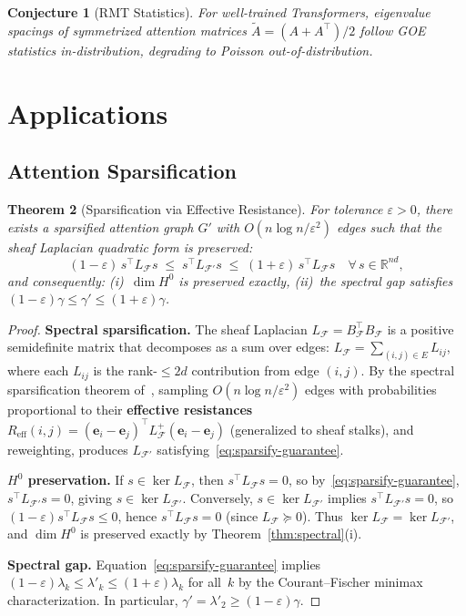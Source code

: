 \documentclass[11pt,a4paper]{article}
\theoremstyle{plain}
\newtheorem{theorem}{Theorem}[section]
\newtheorem{conjecture}[theorem]{Conjecture}
\theoremstyle{definition}
\theoremstyle{remark}
\newcommand{\R}{\mathbb{R}}
\newcommand{\cF}{\mathcal{F}}
\begin{document}
\begin{conjecture}[RMT Statistics]\label{conj:rmt}
For well-trained Transformers, eigenvalue spacings of symmetrized attention matrices $\tilde{A} = (A + A^\top)/2$ follow GOE statistics in-distribution, degrading to Poisson out-of-distribution.
\end{conjecture}

\section{Applications}\label{sec:applications}

\subsection{Attention Sparsification}

\begin{theorem}[Sparsification via Effective Resistance]\label{thm:sparse}
For tolerance $\varepsilon > 0$, there exists a sparsified attention graph $G'$ with $O(n \log n / \varepsilon^2)$ edges such that the sheaf Laplacian quadratic form is preserved:
\begin{equation}\label{eq:sparsify-guarantee}
(1 - \varepsilon)\, s^\top L_\cF s \;\leq\; s^\top L_{\cF'} s \;\leq\; (1 + \varepsilon)\, s^\top L_\cF s \quad \forall\, s \in \R^{nd},
\end{equation}
and consequently: (i)~$\dim H^0$ is preserved exactly, (ii)~the spectral gap satisfies $(1-\varepsilon)\gamma \leq \gamma' \leq (1+\varepsilon)\gamma$.
\end{theorem}

\begin{proof}
\textbf{Spectral sparsification.} The sheaf Laplacian $L_\cF = B_\cF^\top B_\cF$ is a positive semidefinite matrix that decomposes as a sum over edges: $L_\cF = \sum_{(i,j) \in E} L_{ij}$, where each $L_{ij}$ is the rank-$\leq 2d$ contribution from edge $(i,j)$. By the spectral sparsification theorem of~\citet{spielman2011}, sampling $O(n\log n/\varepsilon^2)$ edges with probabilities proportional to their \textbf{effective resistances} $R_{\mathrm{eff}}(i,j) = (\mathbf{e}_i - \mathbf{e}_j)^\top L_\cF^+ (\mathbf{e}_i - \mathbf{e}_j)$ (generalized to sheaf stalks), and reweighting, produces $L_{\cF'}$ satisfying~\eqref{eq:sparsify-guarantee}.

\textbf{$H^0$ preservation.} If $s \in \ker L_\cF$, then $s^\top L_\cF s = 0$, so by~\eqref{eq:sparsify-guarantee}, $s^\top L_{\cF'} s = 0$, giving $s \in \ker L_{\cF'}$. Conversely, $s \in \ker L_{\cF'}$ implies $s^\top L_{\cF'} s = 0$, so $(1-\varepsilon) s^\top L_\cF s \leq 0$, hence $s^\top L_\cF s = 0$ (since $L_\cF \succeq 0$). Thus $\ker L_\cF = \ker L_{\cF'}$, and $\dim H^0$ is preserved exactly by Theorem~\ref{thm:spectral}(i).

\textbf{Spectral gap.} Equation~\eqref{eq:sparsify-guarantee} implies $(1-\varepsilon)\lambda_k \leq \lambda'_k \leq (1+\varepsilon)\lambda_k$ for all~$k$ by the Courant--Fischer minimax characterization. In particular, $\gamma' = \lambda'_2 \geq (1-\varepsilon)\gamma$.
\end{proof}
\end{document}
